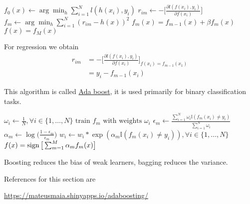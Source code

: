 \documentclass[12 pt]{article}        	%
\begin{document}
\begin{algo}
    
\begin{algorithm}
    \State $ f_0 ( x ) \gets \arg \min_h \sum_{ i = 1 }^N l ( h ( x_i ) , y_i ) $
            \State $ r_{ i m } \gets - \bigg[ \frac{ \partial l ( f ( x_i ) , y_i ) }{ \partial f ( x_i ) } \bigg]$                     \State $ f_m  \gets \arg \min_h \sum_{ i = 1 }^N ( r_{ i m } - h ( x ) )^2$
            \State $ f_m ( x ) = f_{ m - 1 } ( x ) + \beta f_m ( x ) $
        \EndFor
    \State \Return {} $ f ( x ) = f_M ( x ) $
\end{algorithm}
\end{algo}

For regression we obtain 
\begin{align*}
    r_{ i m } 
    &=
    - \bigg[ \frac{ \partial l ( f ( x_i ) , y_i ) }{ \partial f ( x_i ) } \bigg]_{ f ( x_i ) = f_{ m - 1 } ( x_1 ) }
    \\
    &=
    y_i - f_{ m - 1 } ( x_i ) 
\end{align*}

\begin{algo}    
This algorithm is called \underline{Ada boost}, it is used primarily for binary classification tasks.

\begin{algorithm}
\State $ \omega_i \gets \frac{ 1 }{ N } , \forall i \in \{ 1 , \dotsc , N \} $
        \State $ \text{train } f_m \text{ with weights } \omega_i $
        \State $ \epsilon_m \gets \frac{ \sum_{ i = 1 }^N \omega_i \mathbb{ I } ( f_m ( x_i ) \neq y_i ) }{ \sum_{ i =1 }^N \omega_i }$
        \State $ \alpha_m \gets \log \big( \frac{ 1 - \epsilon_m }{ \epsilon_m } \big) $
        \State $ w_i \gets w_i * \exp ( \alpha_m \mathbb{ I } ( f_m ( x_i ) \neq y_i ) ) , \forall i \in \{ 1 , \dotsc , N \}$
    \EndFor
\State \Return{} $ f ( x ) = \operatorname{sign} \big[ \sum_{ m = 1 }^M \alpha_m f_m ( x ) \big] $ 
\end{algorithm}

\end{algo}

\begin{rmk}
    Boosting reduces the bias of weak learners, bagging reduces the variance.    
\end{rmk}

References for this section are 
\begin{center}
    \cite[ch. 4.7.6, 5.2.3, 18]{pml1Book}
    \url{https://mateusmaia.shinyapps.io/adaboosting/}
\end{center}
\end{document}
